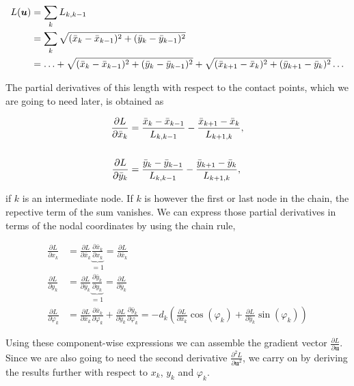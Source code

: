\newpage

\begin{align}
L(\boldsymbol{u}) &= \sum_{k} L_{k,k-1} \notag \\
&= \sum_{k} \sqrt{(\bar{x}_{k} - \bar{x}_{k-1})^2 + (\bar{y}_{k} - \bar{y}_{k-1})^2} \notag \\
&= \ldots + \sqrt{(\bar{x}_{k} - \bar{x}_{k-1})^2 + (\bar{y}_{k} - \bar{y}_{k-1})^2} + \sqrt{(\bar{x}_{k+1} - \bar{x}_{k})^2 + (\bar{y}_{k+1} - \bar{y}_{k})^2} \ldots
\end{align}

The partial derivatives of this length with respect to the contact points, which we are going to need later, is obtained as

\begin{align}
\frac{\partial L}{\partial \bar{x}_{k}} &= \frac{\bar{x}_{k} - \bar{x}_{k-1}}{L_{k,k-1}} - \frac{\bar{x}_{k+1} - \bar{x}_{k}}{L_{k+1,k}}, \\
\notag \\
\frac{\partial L}{\partial \bar{y}_{k}} &= \frac{\bar{y}_{k} - \bar{y}_{k-1}}{L_{k,k-1}} - \frac{\bar{y}_{k+1} - \bar{y}_{k}}{L_{k+1,k}},
\end{align}

if $k$ is an intermediate node.
If $k$ is however the first or last node in the chain, the repective term of the sum vanishes.
We can express those partial derivatives in terms of the nodal coordinates by using the chain rule,

\begin{align}
\frac{\partial L}{\partial x_{k}} &= \frac{\partial L}{\partial \bar{x}_{k}}\underbrace{\frac{\partial \bar{x}_{k}}{\partial x_{k}}}_{= 1} = \frac{\partial L}{\partial \bar{x}_{k}} \\
\frac{\partial L}{\partial y_{k}} &= \frac{\partial L}{\partial \overline{y}_{k}}\underbrace{\frac{\partial \bar{y}_{k}}{\partial y_{k}}}_{= 1} = \frac{\partial L}{\partial \bar{y}_{k}} \\
\frac{\partial L}{\partial \varphi_{k}} &= \frac{\partial L}{\partial \overline{x}_{k}}\frac{\partial \bar{x}_{k}}{\partial \varphi_{k}} + \frac{\partial L}{\partial \bar{y}_{k}}\frac{\partial \bar{y}_{k}}{\partial \varphi_{k}} = -d_{k}\left(\frac{\partial L}{\partial \bar{x}_{k}}\cos(\varphi_{k}) + \frac{\partial L}{\partial \bar{y}_{k}}\sin(\varphi_{k})\right)
\end{align}

Using these component-wise expressions we can assemble the gradient vector $\frac{\partial L}{\partial \boldsymbol{u}}$.
Since we are also going to need the second derivative $\frac{\partial^2 L}{\partial \boldsymbol{u}^2}$, we carry on by deriving the results further with respect to $x_{k}$, $y_{k}$ and $\varphi_{k}$.

